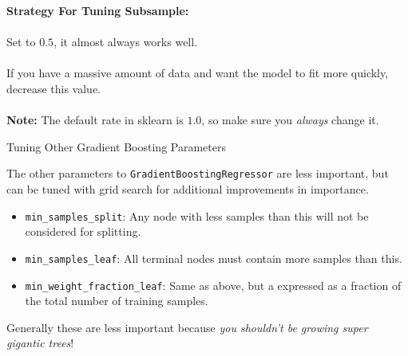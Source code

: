 \begin{frame}
\textbf{Strategy For Tuning Subsample:}\\~\\

Set to $0.5$, it almost always works well.\\~\\

If you have a massive amount of data and want the model to fit more quickly, decrease this value.\\~\\

\textbf{Note:} The default rate in sklearn is $1.0$, so make sure you \textit{always} change it.
\end{frame}
%
\begin{frame}{Tuning Other Gradient Boosting Parameters}

The other parameters to \texttt{GradientBoostingRegressor} are less important, but can be tuned with grid search for additional improvements in importance.

\begin{itemize}
  \item \texttt{min\_samples\_split}: Any node with less samples than this will not be considered for splitting.
  \item \texttt{min\_samples\_leaf}: All terminal nodes must contain more samples than this.
  \item \texttt{min\_weight\_fraction\_leaf}: Same as above, but a expressed as a fraction of the total number of training samples.
\end{itemize}

\end{frame}
%
\begin{frame}
Generally these are less important because \textit{you shouldn't be growing super gigantic trees}!\\~\\
\end{frame}

